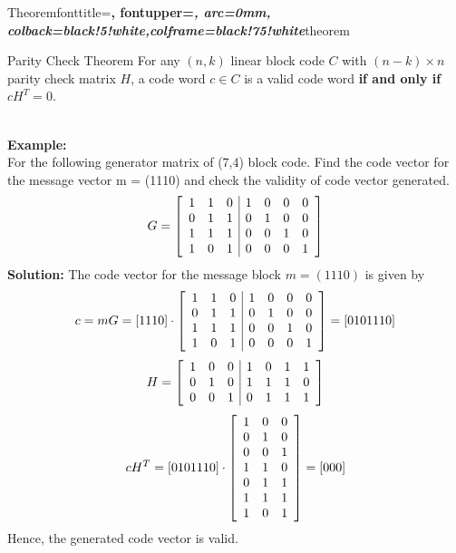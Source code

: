   {Theorem}{fonttitle=\bfseries\upshape, fontupper=\slshape,
     arc=0mm, colback=black!5!white,colframe=black!75!white}{theorem}

\begin{theo}{Parity Check Theorem}{}
    For any $(n, k)$ linear block code $C$ with $(n-k)\times n$ parity check matrix $H$, a code word $c \in C$ is a valid code word \textbf{if and only if} $cH^{T}=0$.
    \par\noindent\dotfill \\
    \textbf{Example:}\\
    For the following generator matrix of (7,4) block code. Find the code vector for the message vector m = (1110) and check the validity of code vector generated.
    \[
    G = \left[ \begin{array}{c c c | c c c c}
        1 & 1 & 0 & 1 & 0 & 0 & 0 \\
        0 & 1 & 1 & 0 & 1 & 0 & 0 \\
        1 & 1 & 1 & 0 & 0 & 1 & 0 \\
        1 & 0 & 1 & 0 & 0 & 0 & 1 
    \end{array} \right]
    \]
    \textbf{Solution:} The code vector for the message block $m = (1110)$ is given by
    \[
    c = mG = [1 1 1 0] \cdot \left[ \begin{array}{c c c | c c c c}
        1 & 1 & 0 & 1 & 0 & 0 & 0 \\
        0 & 1 & 1 & 0 & 1 & 0 & 0 \\
        1 & 1 & 1 & 0 & 0 & 1 & 0 \\
        1 & 0 & 1 & 0 & 0 & 0 & 1 
    \end{array} \right] = [0 1 0 1 1 1 0]
    \]
    \[
    H = \left[ \begin{array}{c c c | c c c c}
        1 & 0 & 0 & 1 & 0 & 1 & 1 \\
        0 & 1 & 0 & 1 & 1 & 1 & 0 \\
        0 & 0 & 1 & 0 & 1 & 1 & 1 
    \end{array} \right]
    \]
    \[
    cH^T = [0 1 0 1 1 1 0] \cdot \left[ \begin{array}{c c c}
        1 & 0 & 0 \\
        0 & 1 & 0 \\
        0 & 0 & 1 \\
        1 & 1 & 0 \\
        0 & 1 & 1 \\
        1 & 1 & 1 \\
        1 & 0 & 1 
    \end{array} \right] = [0 0 0]
    \]
    Hence, the generated code vector is valid.
\end{theo}

